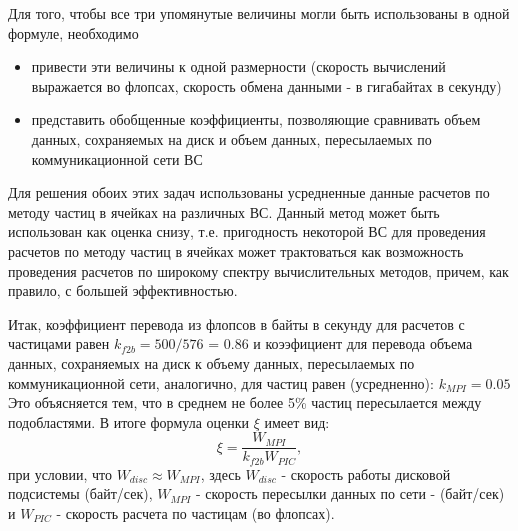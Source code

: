 Для того, чтобы все три упомянутые величины могли быть использованы в одной формуле, необходимо 
\begin{itemize}
	\item привести эти величины к одной размерности (скорость вычислений выражается во флопсах, скорость обмена данными - в гигабайтах в секунду)
	\item представить обобщенные коэффициенты, позволяющие сравнивать объем данных, сохраняемых на диск и объем данных, пересылаемых по коммуникационной сети ВС  
\end{itemize}


Для решения обоих этих задач использованы усредненные данные расчетов по методу частиц в ячейках на различных ВС. Данный метод может быть использован как оценка снизу, т.е. пригодность некоторой ВС для проведения расчетов по методу частиц в ячейках может трактоваться как возможность проведения расчетов по широкому спектру вычислительных методов, причем, как правило, с большей эффективностью.

Итак, коэффициент перевода из флопсов в байты в секунду для расчетов с частицами равен
$k_{f2b} = 500/576$ = 0.86   
и коээфициент для перевода объема данных, сохраняемых на диск к объему данных, пересылаемых по коммуникационной сети, аналогично, для частиц равен (усредненно):
$k_{MPI} = 0.05$ 
Это объясняется тем, что в среднем не более 5\% частиц пересылается между подобластями.
В итоге формула оценки $\xi$ имеет вид:
$$
\xi = \frac{W_{MPI}} {k_{f2b} W_{PIC}}, 
$$
при условии, что $W_{disc} \approx W_{MPI}$,
здесь $W_{disc}$ - скорость работы дисковой подсистемы (байт/сек), $W_{MPI}$
- скорость пересылки данных по сети - (байт/сек) и $W_{PIC}$ - скорость расчета по частицам (во флопсах).	


